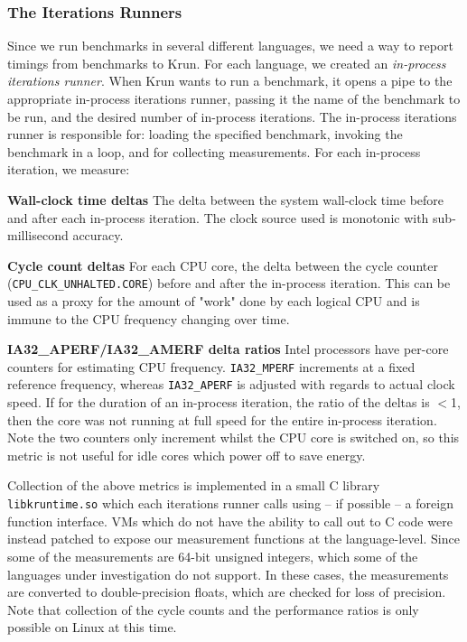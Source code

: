 \documentclass[preprint,numbers,10pt]{sigplanconf}
\newcommand{\krun}{Krun\xspace}
\begin{document}
\subsubsection{The Iterations Runners}

Since we run benchmarks in several different languages, we need a way to report
timings from benchmarks to \krun. For each language, we created an
\emph{in-process iterations runner}. When \krun wants to run a benchmark, it opens a pipe to the
appropriate in-process iterations runner, passing it the name of the
benchmark to be run, and the desired number of in-process iterations. The
in-process iterations runner is responsible for: loading the specified
benchmark, invoking the benchmark in a loop, and for collecting measurements.
For each in-process iteration, we measure:

\textbf{Wall-clock time deltas} The delta between the system wall-clock time before
    and after each in-process iteration. The clock source used is monotonic
    with sub-millisecond accuracy.

\textbf{Cycle count deltas} For each CPU core, the delta between the
    cycle counter (\texttt{CPU\_CLK\_UNHALTED.CORE}) before and after the
    in-process iteration. This can be used as a proxy for the amount of "work"
    done by each logical CPU and is immune to the CPU frequency changing over
    time.

\textbf{IA32\_APERF/IA32\_AMERF delta ratios} Intel processors have
    per-core counters for estimating CPU frequency. \texttt{IA32\_MPERF}
    increments at a fixed reference frequency, whereas \texttt{IA32\_APERF} is
    adjusted with regards to actual clock speed. If for the duration of an
    in-process iteration, the ratio of the deltas is $<$1, then the core was
    not running at full speed for the entire in-process iteration. Note the two
    counters only increment whilst the CPU core is switched on, so this metric
    is not useful for idle cores which power off to save energy.

Collection of the above metrics is implemented in a small C library
\texttt{libkruntime.so} which each iterations runner calls using -- if possible
-- a foreign function interface. VMs which do not have the ability to call out
to C code were instead patched to expose our measurement functions at the
language-level. Since some of the measurements are 64-bit unsigned integers,
which some of the languages under investigation do not support. In these cases,
the measurements are converted to double-precision floats, which are checked
for loss of precision. Note that collection of the cycle counts and the
performance
ratios is only possible on Linux at this time.
\end{document}
